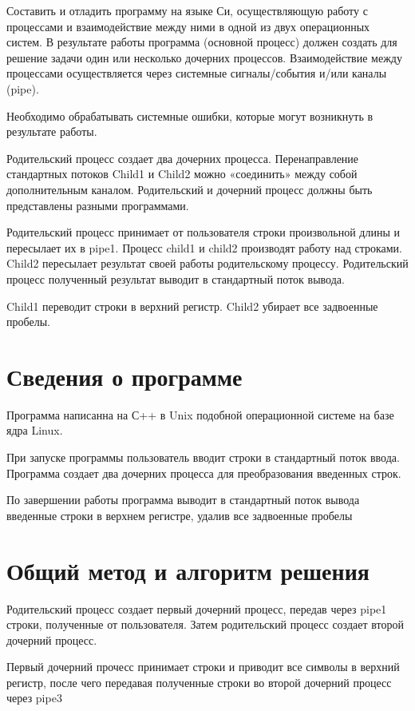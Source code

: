 \documentclass[pdf, unicode, 12pt, a4paper,oneside,fleqn]{article}
\begin{document}
Составить и отладить программу на языке Си, осуществляющую работу с процессами и
взаимодействие между ними в одной из двух операционных систем. В результате работы
программа (основной процесс) должен создать для решение задачи один или несколько
дочерних процессов. Взаимодействие между процессами осуществляется через системные
сигналы/события и/или каналы (pipe).

Необходимо обрабатывать системные ошибки, которые могут возникнуть в результате работы.

Родительский процесс создает два дочерних процесса. Перенаправление стандартных потоков
Child1 и Child2 можно «соединить» между собой
дополнительным каналом. Родительский и дочерний процесс должны быть представлены
разными программами.

Родительский процесс принимает от пользователя строки произвольной длины и пересылает их в
pipe1. Процесс child1 и child2 производят работу над строками. Child2 пересылает результат своей
работы родительскому процессу. Родительский процесс полученный результат выводит в
стандартный поток вывода.


Child1 переводит строки в верхний регистр. Child2 убирает все задвоенные пробелы.

\section{Сведения о программе}

Программа написанна на С++ в Unix подобной операционной системе на базе ядра Linux.

При запуске программы пользователь вводит строки в стандартный поток ввода. Программа создает два дочерних процесса для преобразования введенных строк.

По завершении работы программа выводит в стандартный поток вывода введенные строки в верхнем регистре, удалив все задвоенные пробелы

\section{Общий метод и алгоритм решения}

Родительский процесс создает первый дочерний процесс, передав через pipe1 строки, полученные от пользователя. Затем родительский процесс создает второй дочерний процесс.

Первый дочерний прочесс принимает строки и приводит все символы в верхний регистр, после чего передавая полученные строки во второй дочерний процесс через pipe3
\end{document}
